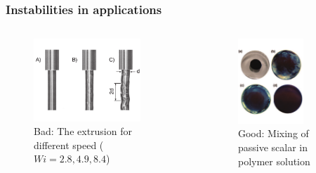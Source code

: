 \begin{frame}
  \frametitle{Instabilities in applications}
  \begin{columns}
    \begin{column}{0.5\textwidth}
      \begin{figure}[t]
        \centering
        \includegraphics[width=0.8\textwidth]{img/melt.pdf}
        \caption{\alert{Bad}: The extrusion for different speed ($Wi=2.8, 4.9,
          8.4$)~\footnotemark}
        \label{fig:snap}
      \end{figure}
    \end{column}
    \begin{column}{0.5\textwidth}
      \begin{figure}[t]
        \centering
        \includegraphics[width=0.7\textwidth]{img/mix2.pdf}
        \caption{\alert{Good}: Mixing of passive scalar in polymer solution~\footnotemark}
        \label{fig:snap}
      \end{figure}
    \end{column}
  \end{columns}
\end{frame}

